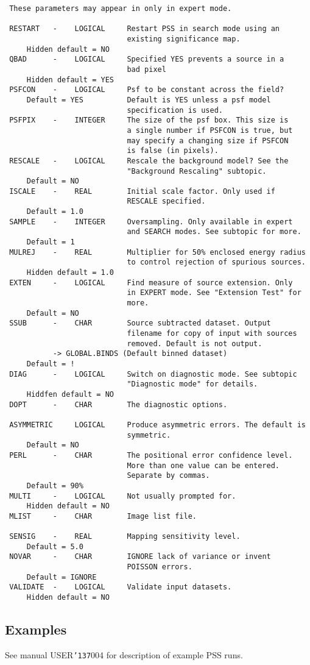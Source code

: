 \documentclass{book}
\renewcommand{\_}{{\tt\char'137}}     %
\begin{document}
\begin{verbatim}
 These parameters may appear in only in expert mode.
 
 RESTART   -    LOGICAL     Restart PSS in search mode using an
                            existing significance map.
     Hidden default = NO
 QBAD      -    LOGICAL     Specified YES prevents a source in a
                            bad pixel
     Hidden default = YES
 PSFCON    -    LOGICAL     Psf to be constant across the field?
     Default = YES          Default is YES unless a psf model
                            specification is used.
 PSFPIX    -    INTEGER     The size of the psf box. This size is
                            a single number if PSFCON is true, but
                            may specify a changing size if PSFCON
                            is false (in pixels).
 RESCALE   -    LOGICAL     Rescale the background model? See the
                            "Background Rescaling" subtopic.
     Default = NO
 ISCALE    -    REAL        Initial scale factor. Only used if
                            RESCALE specified.
     Default = 1.0
 SAMPLE    -    INTEGER     Oversampling. Only available in expert
                            and SEARCH modes. See subtopic for more.
     Default = 1
 MULREJ    -    REAL        Multiplier for 50% enclosed energy radius
                            to control rejection of spurious sources.
     Hidden default = 1.0
 EXTEN     -    LOGICAL     Find measure of source extension. Only
                            in EXPERT mode. See "Extension Test" for
                            more.
     Default = NO
 SSUB      -    CHAR        Source subtracted dataset. Output
                            filename for copy of input with sources
                            removed. Default is not output.
           -> GLOBAL.BINDS (Default binned dataset)
     Default = !
 DIAG      -    LOGICAL     Switch on diagnostic mode. See subtopic
                            "Diagnostic mode" for details.
     Hiddfen default = NO
 DOPT      -    CHAR        The diagnostic options.
 
 ASYMMETRIC     LOGICAL     Produce asymmetric errors. The default is
                            symmetric.
     Default = NO
 PERL      -    CHAR        The positional error confidence level.
                            More than one value can be entered.
                            Separate by commas.
     Default = 90%
 MULTI     -    LOGICAL     Not usually prompted for.
     Hidden default = NO
 MLIST     -    CHAR        Image list file.
 
 SENSIG    -    REAL        Mapping sensitivity level.
     Default = 5.0
 NOVAR     -    CHAR        IGNORE lack of variance or invent
                            POISSON errors.
     Default = IGNORE
 VALIDATE  -    LOGICAL     Validate input datasets.
     Hidden default = NO
\end{verbatim}\subsection{Examples}
See manual USER\_004 for description of example PSS runs.
\end{document}
